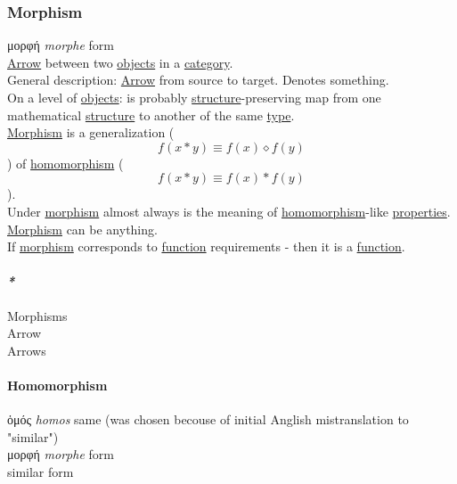 \documentclass[11pt]{article}
\begin{document}
\subsubsection{\label{orgad99fc6}Morphism}
\label{sec:org8716491}
μορφή \emph{morphe} form\\
\hyperref[org5b6e6e9]{Arrow} between two \hyperref[orge0f000f]{objects} in a \hyperref[org3e3a79b]{category}.\\

General description: \hyperref[org5b6e6e9]{Arrow} from source to target. Denotes something.\\

On a level of \hyperref[orge0f000f]{objects}: is probably \hyperref[org93ee82c]{structure}-preserving map from one mathematical \hyperref[org93ee82c]{structure} to another of the same \hyperref[org4fbaeb8]{type}.\\

\hyperref[orgad99fc6]{Morphism} is a generalization ($$ f(x*y) \equiv f(x) \diamond f(y) $$) of \hyperref[org01da5b8]{homomorphism} ($$ f(x*y) \equiv f(x) * f(y) $$).\\
Under \hyperref[orgad99fc6]{morphism} almost always is the meaning of \hyperref[org01da5b8]{homomorphism}-like \hyperref[org763ad6b]{properties}.\\

\hyperref[orgad99fc6]{Morphism} can be anything.\\

If \hyperref[orgad99fc6]{morphism} corresponds to \hyperref[orgeb5cddb]{function} requirements - then it is a \hyperref[orgeb5cddb]{function}.\\

\paragraph{\emph{*}}
\label{sec:orgf72d31c}

\label{org8ed0ce8}Morphisms\\
\label{org5b6e6e9}Arrow\\
\label{org33f3f3f}Arrows\\

\paragraph{\label{org01da5b8}Homomorphism}
\label{sec:org293ef0f}
ὁμός \emph{homos} same (was chosen becouse of initial Anglish mistranslation to "similar")\\
μορφή \emph{morphe} form\\
similar form\\
\end{document}
